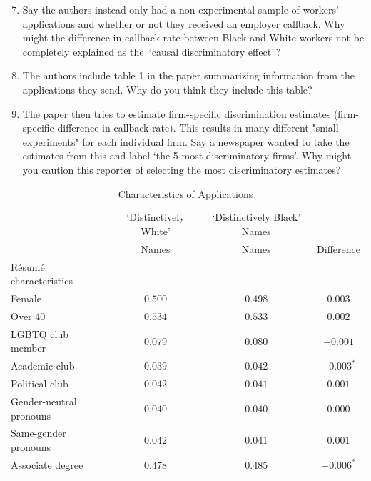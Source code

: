 \documentclass[12pt]{article}
\begin{document}
\bigskip
\begin{enumerate}
    \setcounter{enumi}{6}
  \item Say the authors instead only had a non-experimental sample of
    workers' applications and whether or not they received an employer callback.
    Why might the difference in callback rate between Black and White
    workers not be completely explained as the ``causal discriminatory effect''?

  \item The authors include table 1 in the paper summarizing
    information from the applications they send.
    Why do you think they include this table?

  \item The paper then tries to estimate firm-specific discrimination
    estimates (firm-specific difference in callback rate).
    This results in many different "small experiments" for each individual firm.
    Say a newspaper wanted to take the estimates from this and label
    `the 5 most discriminatory firms'.
    Why might you caution this reporter of selecting the most
    discriminatory estimates?
\end{enumerate}

\begin{table}[!b]
  \centering
  \caption{Characteristics of Applications}
  \begin{tabular}{lccc}
    \toprule
    & {\small`Distinctively White' } & {\small`Distinctively Black' Names} & \\
    & {\small Names} & {\small Names} & {\small Difference} \\
    \midrule
    Résumé characteristics \\
    \quad Female & $0.500$ & $0.498$ & $0.003$ \\
    \quad Over 40 & $0.534$ & $0.533$ & $0.002$ \\
    \quad LGBTQ club member & $0.079$ & $0.080$ & $-0.001$ \\
    \quad Academic club & $0.039$ & $0.042$ & $-0.003^{*}$ \\
    \quad Political club & $0.042$ & $0.041$ & $0.001$ \\
    \quad Gender-neutral pronouns & $0.040$ & $0.040$ & $0.000$ \\
    \quad Same-gender pronouns & $0.042$ & $0.041$ & $0.001$ \\
    \quad Associate degree & $0.478$ & $0.485$ & $-0.006^{*}$ \\
    \bottomrule
  \end{tabular}
\end{table}
\end{document}
